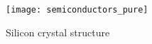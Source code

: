 





\begin{wrapfigure}{r}{0.4\textwidth}
\begin{center}
\caption{Silicon crystal structure}
\texttt{[image: semiconductors\_pure]}\label{f-semiconductor-pure}
\end{center}
\end{wrapfigure}

